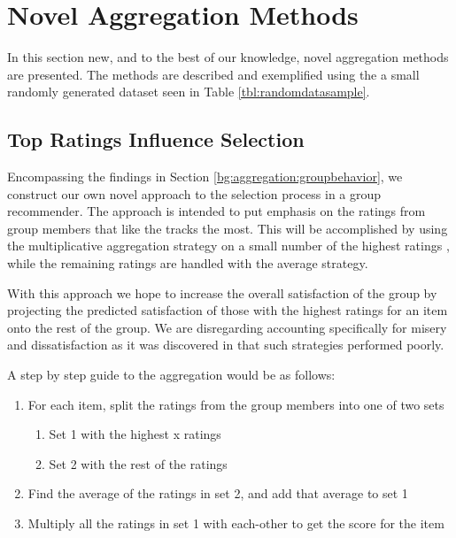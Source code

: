 \section{Novel Aggregation Methods}
In this section new, and to the best of our knowledge, novel aggregation methods are presented. The methods are described and exemplified using the a small randomly generated dataset seen in Table \ref{tbl:randomdatasample}. 

\subsection{Top Ratings Influence Selection}
Encompassing the findings in Section \ref{bg:aggregation:groupbehavior}, we construct our own novel approach to the selection process in a group recommender. The approach is intended to put emphasis on the ratings from group members that like the tracks the most. This will be accomplished by using the multiplicative aggregation strategy on a small number of the highest ratings , while the remaining ratings are handled with the average strategy.

With this approach we hope to increase the overall satisfaction of the group by projecting the predicted satisfaction of those with the highest ratings for an item onto the rest of the group. We are disregarding accounting specifically for misery and dissatisfaction as it was discovered in \cite{d}  that such strategies performed poorly.

A step by step guide to the aggregation would be as follows:
\begin{enumerate}
	\item For each item, split the ratings from the group members into one of two sets
	\begin{enumerate}
		\item Set 1 with the highest x ratings
		\item Set 2 with the rest of the ratings
	\end{enumerate}
	\item Find the average of the ratings in set 2, and add that average to set 1
	\item Multiply all the ratings in set 1 with each-other to get the score for the item
\end{enumerate}

